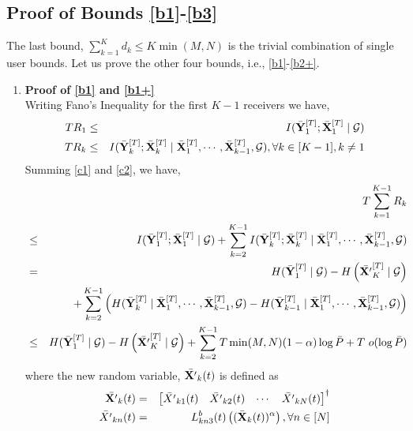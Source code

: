 \documentclass[11pt]{article}
\begin{document}
\subsection{Proof of Bounds \eqref{b1}-\eqref{b3}}\label{mt}
The last bound,  $\sum_{k=1}^Kd_k\le K\min(M,N)$ is the trivial combination of single user bounds.  Let us prove the other four  bounds, i.e., \eqref{b1}-\eqref{b2+}. 
\begin{enumerate}
\item {\bf Proof of \eqref{b1} and \eqref{b1+}}\\

 Writing Fano's Inequality for the first $K-1$ receivers we have,
\begin{eqnarray}
TR_1&\le& I(\bar{\bf Y}^{[T]}_{1};\bar{\bf X}^{[T]}_{1}\mid \mathcal{G})\label{c1}\\
TR_k&\le& I(\bar{\bf Y}^{[T]}_{k};\bar{\bf X}^{[T]}_{k}\mid \bar{\bf X}^{[T]}_{1},\cdots,\bar{\bf X}^{[T]}_{k-1},\mathcal{G}), \forall k\in[K-1],k\neq 1\label{c2}
\end{eqnarray}
{Summing}  \eqref{c1} and \eqref{c2}, we have,
\begin{eqnarray}
&&T\sum_{k=1}^{K-1}R_k\nonumber\\
&\le& I(\bar{\bf Y}^{[T]}_{1};\bar{\bf X}^{[T]}_{1}\mid \mathcal{G})+\sum_{k=2}^{K-1} I(\bar{\bf Y}^{[T]}_{k};\bar{\bf X}^{[T]}_{k}\mid \bar{\bf X}^{[T]}_{1},\cdots,\bar{\bf X}^{[T]}_{k-1},\mathcal{G})\\
&=& H(\bar{\bf Y}^{[T]}_{1}\mid \mathcal{G})-H\left(\bar{\bf X'}^{[T]}_{K}\mid \mathcal{G}\right)\nonumber\\
&&+\sum_{k=2}^{K-1} \left(H(\bar{\bf Y}^{[T]}_{k}\mid  \bar{\bf X}^{[T]}_{1},\cdots,\bar{\bf X}^{[T]}_{k-1},\mathcal{G})-H(\bar{\bf Y}^{[T]}_{k-1}\mid  \bar{\bf X}^{[T]}_{1},\cdots,\bar{\bf X}^{[T]}_{k-1},\mathcal{G})\right)\\
&\le& H(\bar{\bf Y}^{[T]}_{1}\mid \mathcal{G})-H\left(\bar{\bf X'}^{[T]}_{K}\mid \mathcal{G}\right)+\sum_{k=2}^{K-1} T\min(M,N)(1-\alpha)\log{\bar{P}}+T~o(\log{\bar{P}})\label{c3}
\end{eqnarray}
where the new random variable,  $\bar{\bf X'}_k(t)$ is defined as\\
\begin{eqnarray}
\bar{\bf X'}_k(t)&=&\begin{bmatrix}\bar{X'}_{k1}(t)&\bar{X'}_{k2}(t)&\cdots&\bar{X'}_{kN}(t)\end{bmatrix}^\dagger\\
\bar{X'}_{kn}(t)&=&{L}_{kn3}^b(t)\left((\bar{\bf X}_{k}(t))^{\alpha}\right), \forall n\in[N]

\end{eqnarray}
\end{enumerate}
\end{document}
